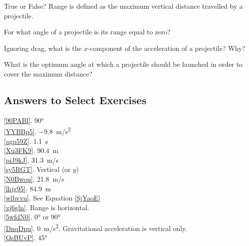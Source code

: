 \documentclass[dvipsnames]{article}
\numberwithin{equation}{section}
\numberwithin{figure}{section}
\begin{document}

\begin{exercise} \label{xj6gln}
    True or False? Range is defined as the maximum vertical distance travelled by a projectile. 
\end{exercise}

\begin{exercise} \label{5wfdN0}
    For what angle of a projectile is its range equal to zero?
\end{exercise}

\begin{exercise} \label{DnqDpu}
    Ignoring drag, what is the $x$-component of the acceleration of a projectile? Why?
\end{exercise}

\begin{exercise} \label{QsBUvP}
    What is the optimum angle at which a projectile should be launched in order to cover the maximum distance?
\end{exercise}

\clearpage

\printnoidxglossaries

\subsection*{Answers to Select Exercises}

\ref{90PABl}. \ang{90}\\
\ref{YYBBp5}. \SI{-9.8}{m/s^2}\\
\ref{agp59Z}. \SI{1.1}{s}\\
\ref{Xu3FK9}. \SI{90.4}{m}\\
\ref{piJ9kJ}. \SI{31.3}{m/s}\\
\ref{sy5RGT}. Vertical (or $y$)\\
\ref{N0Bwou}. \SI{21.8}{m/s}\\
\ref{lhjg95}. \SI{84.9}{m}\\
\ref{wlbvvu}. See Equation \eqref{SjYaoE}\\
\ref{xj6gln}. Range is horizontal.\\
\ref{5wfdN0}. \ang{0} or \ang{90}\\
\ref{DnqDpu}. \SI{0}{m/s^2}. Gravitational acceleration is vertical only.\\
\ref{QsBUvP}. \ang{45}\\
\end{document}
